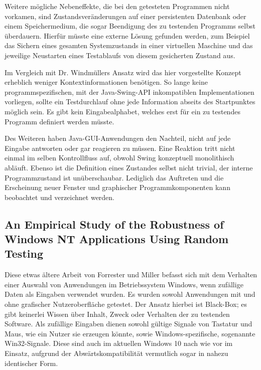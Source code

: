 Weitere mögliche Nebeneffekte, die bei den getesteten Programmen nicht vorkamen, sind
Zustandsveränderungen auf einer persistenten Datenbank oder einem Speichermedium, die sogar
Beendigung des zu testenden Programms selbst überdauern. Hierfür müsste eine externe
Lösung gefunden werden, zum Beispiel das Sichern eines gesamten Systemzustands in einer
virtuellen Maschine und das jeweilige Neustarten eines Testablaufs von diesem gesicherten
Zustand aus.


\vspace{0.5cm}

Im Vergleich mit Dr. Windmüllers Ansatz wird das hier vorgestellte Konzept erheblich weniger
Kontextinformationen benötigen. So lange keine programmspezifischen, mit der Java-Swing-API
inkompatiblen Implementationen vorliegen, sollte ein Testdurchlauf ohne jede Information abseits
des Startpunktes möglich sein. Es gibt kein Eingabealphabet, welches erst für ein zu testendes
Programm definiert werden müsste.

Des Weiteren haben Java-GUI-Anwendungen den Nachteil, nicht auf jede Eingabe antworten oder gar
reagieren zu müssen. Eine Reaktion tritt nicht einmal im selben Kontrollfluss auf, obwohl Swing
konzeptuell monolithisch abläuft. Ebenso ist die Definition eines Zustandes selbst nicht trivial,
der interne Programmzustand ist unüberschaubar. Lediglich das Auftreten und die Erscheinung neuer
Fenster und graphischer Programmkomponenten kann beobachtet und verzeichnet werden.



\subsection{An Empirical Study of the Robustness of Windows NT Applications Using Random Testing}\label{ssection:windmueller}


Diese etwas ältere Arbeit von Forrester und Miller \cite{winNTforrester} befasst sich 
mit dem Verhalten einer Auswahl von Anwendungen im Betriebssystem Windows, wenn zufällige 
Daten als Eingaben verwendet wurden.
Es wurden sowohl Anwendungen mit und ohne grafischer Nutzeroberfläche getestet. Der Ansatz hierbei
ist Black-Box; es gibt keinerlei Wissen über Inhalt, Zweck oder Verhalten der zu testenden Software.
Als zufällige Eingaben dienen sowohl gültige Signale von Tastatur und Maus, wie ein Nutzer sie erzeugen
könnte, sowie Windows-spezifische, sogenannte \glqq{}Win32\grqq{}-Signale. Diese sind auch im aktuellen Windows 10
nach wie vor im Einsatz, aufgrund der Abwärtskompatibilität vermutlich sogar in nahezu identischer Form.


